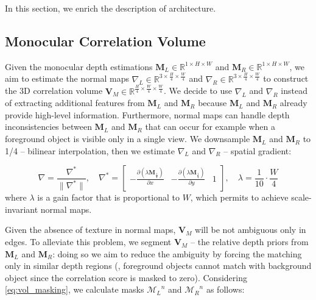 In this section, we enrich the description of \method architecture.

\subsection{Monocular Correlation Volume}
\label{subsec:mono_corr}

Given the monocular depth estimations $\textbf{M}_L \in \mathbb{R}^{1 \times H \times W}$ and $\textbf{M}_R \in \mathbb{R}^{1 \times H \times W}$, we aim to estimate the normal maps $\nabla_L \in \mathbb{R}^{3 \times \frac{H}{4} \times \frac{W}{4}}$ and $\nabla_R \in \mathbb{R}^{3 \times \frac{H}{4} \times \frac{W}{4}}$ to construct the 3D correlation volume $\mathbf{V}_M \in \mathbb{R}^{\frac{H}{4} \times \frac{W}{4} \times \frac{W}{4}}$.
We decide to use $\nabla_L$ and $\nabla_R$ instead of extracting additional features from $\textbf{M}_L$ and $\textbf{M}_R$ because $\textbf{M}_L$ and $\textbf{M}_R$ already provide high-level information.
Furthermore, normal maps can handle depth inconsistencies between $\textbf{M}_L$ and $\textbf{M}_R$ that can occur for example when a foreground object is visible only in a single view.
We downsample $\textbf{M}_L$ and $\textbf{M}_R$ to 1/4  -- bilinear interpolation, then we estimate $\nabla_L$ and $\nabla_R$  -- spatial gradient:

\small\begin{equation}
    \nabla = \frac{\nabla^*}{\lVert \nabla^* \rVert}, \quad \nabla^* = \begin{bmatrix}
        -\frac{\partial \left(\lambda\mathbf{M}_\frac{1}{4}\right)}{\partial x} & -\frac{\partial \left(\lambda\mathbf{M}_\frac{1}{4}\right)}{\partial y} & 1 \\
    \end{bmatrix}, \quad \lambda = \frac{1}{10}\cdot\frac{W}{4}
    \label{eq:normal_estimation}
\end{equation}\normalsize
where $\lambda$ is a gain factor that is proportional to $W$, which permits to achieve scale-invariant normal maps.

Given the absence of texture in normal maps, $\textbf{V}_M$ will be not ambiguous only in edges.
To alleviate this problem, we segment $\textbf{V}_M$  -- the relative depth priors from $\textbf{M}_L$ and $\textbf{M}_R$: doing so we aim to reduce the ambiguity by forcing the matching only in similar depth regions (\eg, foreground objects cannot match with background object since the correlation score is masked to zero).
Considering \cref{eq:vol_masking}, we calculate masks ${\mathcal{M}_L}^n$ and ${\mathcal{M}_R}^n$ as follows:

